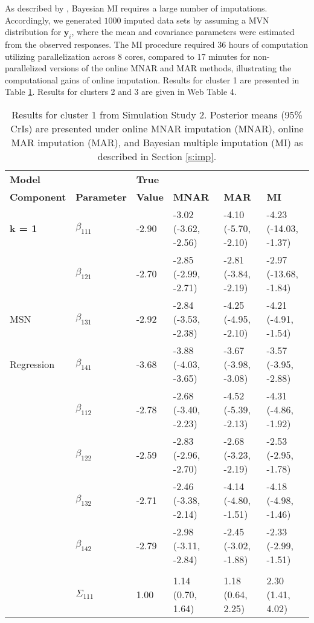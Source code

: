 \documentclass[useAMS,usenatbib,referee]{biom}
\begin{document}
As described by \citet{zhou2010note}, Bayesian MI requires a large number of imputations. Accordingly, we generated $1000$ imputed data sets by assuming a MVN distribution for $\mathbf{y}_i$, where the mean and covariance parameters were estimated from the observed responses. The MI procedure required 36 hours of computation utilizing parallelization across 8 cores, compared to 17 minutes for non-parallelized versions of the online MNAR and MAR methods, illustrating the computational gains of online imputation. Results for cluster 1 are presented in Table \ref{tab:sim2}. Results for clusters 2 and 3 are given in Web Table 4.
\begin{table}[t]
\caption{\label{tab:sim2} Results for cluster 1 from Simulation Study 2. Posterior means (95\% CrIs) are presented under online MNAR imputation (MNAR), online MAR imputation (MAR), and Bayesian multiple imputation (MI) as described in Section \ref{s:imp}.}
\begin{center}
\begin{tabular}{llllll}
\toprule
\textbf{Model} & & \textbf{True} & & & \\
\textbf{Component} & \textbf{Parameter} & \textbf{Value} & \textbf{MNAR} & \textbf{MAR} & \textbf{MI}\\
\midrule
\textbf{k = 1} & $\beta_{111}$ & -2.90 & -3.02 (-3.62, -2.56) & -4.10 (-5.70, -2.10) & -4.23 (-14.03, -1.37)\\
& $\beta_{121}$ & -2.70 & -2.85 (-2.99, -2.71) & -2.81 (-3.84, -2.19) & -2.97 (-13.68, -1.84)\\
MSN & $\beta_{131}$ & -2.92 & -2.84 (-3.53, -2.38) & -4.25 (-4.95, -2.10) & -4.21 (-4.91, -1.54)\\
Regression & $\beta_{141}$ & -3.68 & -3.88 (-4.03, -3.65) & -3.67 (-3.98, -3.08) & -3.57 (-3.95, -2.88)\\
& $\beta_{112}$ & -2.78 & -2.68 (-3.40, -2.23) & -4.52 (-5.39, -2.13) & -4.31 (-4.86, -1.92)\\
& $\beta_{122}$ & -2.59 & -2.83 (-2.96, -2.70) & -2.68 (-3.23, -2.19) & -2.53 (-2.95, -1.78)\\
& $\beta_{132}$ & -2.71 & -2.46 (-3.38, -2.14) & -4.14 (-4.80, -1.51) & -4.18 (-4.98, -1.46)\\
& $\beta_{142}$ & -2.79 & -2.98 (-3.11, -2.84) & -2.45 (-3.02, -1.88) & -2.33 (-2.99, -1.51)\\
\addlinespace[0.2em]
\multicolumn{5}{l}{\textbf{ }}\\
& $\Sigma_{111}$ & 1.00 & 1.14 (0.70, 1.64) & 1.18 (0.64, 2.25) & 2.30 (1.41, 4.02)\\

\end{tabular}
\end{center}
\end{table}
\end{document}
